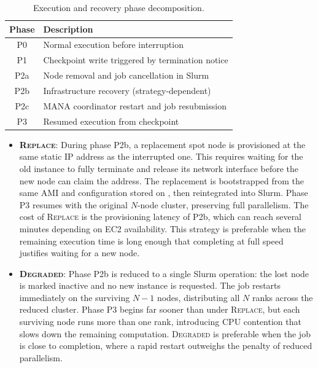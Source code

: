 \documentclass[conference]{IEEEtran}
\begin{document}
\begin{table}[t]
    \caption{Execution and recovery phase decomposition.}
    \label{tab:phases}
    \centering
    \begin{tabular}{cl}
        \toprule
        \textbf{Phase} & \textbf{Description} \\
        \midrule
        P0  & Normal execution before interruption \\
        P1  & Checkpoint write triggered by termination notice \\
        P2a & Node removal and job cancellation in Slurm \\
        P2b & Infrastructure recovery (strategy-dependent) \\
        P2c & MANA coordinator restart and job resubmission \\
        P3  & Resumed execution from checkpoint \\
        \bottomrule
    \end{tabular}
\end{table}

\begin{itemize}
    \item \textbf{\textsc{Replace}}: During phase P2b, a replacement spot node is provisioned at the same static IP address as the interrupted one. This requires waiting for the old instance to fully terminate and release its network interface before the new node can claim the address. The replacement is bootstrapped from the same AMI and configuration stored on \EFS, then reintegrated into Slurm. Phase P3 resumes with the original $N$-node cluster, preserving full parallelism. The cost of \textsc{Replace} is the provisioning latency of P2b, which can reach several minutes depending on EC2 availability. This strategy is preferable when the remaining execution time is long enough that completing at full speed justifies waiting for a new node.

    \item \textbf{\textsc{Degraded}}: Phase P2b is reduced to a single Slurm operation: the lost node is marked inactive and no new instance is requested. The job restarts immediately on the surviving $N-1$ nodes, distributing all $N$ \MPI ranks across the reduced cluster. Phase P3 begins far sooner than under \textsc{Replace}, but each surviving node runs more than one rank, introducing CPU contention that slows down the remaining computation. \textsc{Degraded} is preferable when the job is close to completion, where a rapid
restart outweighs the penalty of reduced parallelism.
\end{itemize}
\end{document}
